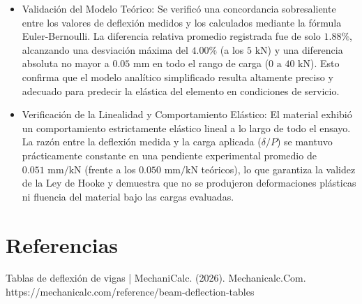 \begin{itemize}
    \item Validación del Modelo Teórico: Se verificó una concordancia sobresaliente entre los valores de deflexión medidos y los calculados mediante la fórmula Euler-Bernoulli. La diferencia relativa promedio registrada fue de solo $1.88\%$, alcanzando una desviación máxima del $4.00\%$ (a los $5\text{ kN}$) y una diferencia absoluta no mayor a $0.05\text{ mm}$ en todo el rango de carga ($0\text{ a }40\text{ kN}$). Esto confirma que el modelo analítico simplificado resulta altamente preciso y adecuado para predecir la elástica del elemento en condiciones de servicio.
    \item Verificación de la Linealidad y Comportamiento Elástico: El material exhibió un comportamiento estrictamente elástico lineal a lo largo de todo el ensayo. La razón entre la deflexión medida y la carga aplicada ($\delta/P$) se mantuvo prácticamente constante en una pendiente experimental promedio de $0.051\text{ mm/kN}$ (frente a los $0.050\text{ mm/kN}$ teóricos), lo que garantiza la validez de la Ley de Hooke y demuestra que no se produjeron deformaciones plásticas ni fluencia del material bajo las cargas evaluadas.
\end{itemize}

\newpage
\section{Referencias}
Tablas de deflexión de vigas | MechaniCalc. (2026). Mechanicalc.Com. https://mechanicalc.com/reference/beam-deflection-tables

‌

